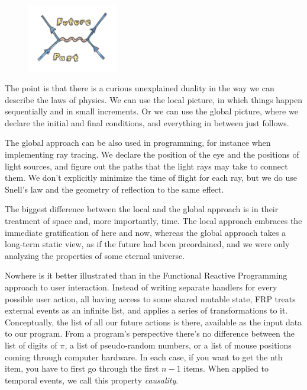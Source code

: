 \begin{figure}[H]
\centering
\includegraphics[width=1.56250in]{images/feynman.jpg}
\end{figure}

\noindent
The point is that there is a curious unexplained duality in the way we
can describe the laws of physics. We can use the local picture, in which
things happen sequentially and in small increments. Or we can use the
global picture, where we declare the initial and final conditions, and
everything in between just follows.

The global approach can be also used in programming, for instance when
implementing ray tracing. We declare the position of the eye and the
positions of light sources, and figure out the paths that the light rays
may take to connect them. We don't explicitly minimize the time of
flight for each ray, but we do use Snell's law and the geometry of
reflection to the same effect.

The biggest difference between the local and the global approach is in
their treatment of space and, more importantly, time. The local approach
embraces the immediate gratification of here and now, whereas the global
approach takes a long-term static view, as if the future had been
preordained, and we were only analyzing the properties of some eternal
universe.

Nowhere is it better illustrated than in the Functional Reactive
Programming approach to user interaction. Instead of writing separate
handlers for every possible user action, all having access to some
shared mutable state, FRP treats external events as an infinite list,
and applies a series of transformations to it. Conceptually, the list of
all our future actions is there, available as the input data to our
program. From a program's perspective there's no difference between the
list of digits of \ensuremath{\pi}, a list of pseudo-random numbers, or a list of mouse
positions coming through computer hardware. In each case, if you want to
get the nth item, you have to first go through the first \ensuremath{n-1} items. When
applied to temporal events, we call this property \emph{causality}.

